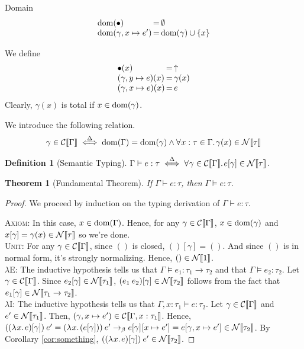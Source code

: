 \documentclass{article}
\newtheorem{theorem}{Theorem}
\theoremstyle{definition}
\newtheorem{definition}{Definition}
\begin{document}
Domain
\[
  \begin{array}{l@{\,=\,}l}
    \Dom(\bullet) & \emptyset\\
    \Dom(\gamma, x \mapsto e') & \Dom(\gamma) \cup \{x\}
  \end{array}
\]

We define
\[
  \begin{array}{l@{\,=\,}l}
    \bullet(x) & \uparrow\\
    (\gamma, y \mapsto e)(x) & \gamma(x)\\
    (\gamma, x \mapsto e)(x) & e
  \end{array}
\]
Clearly, $\gamma(x)$ is total if $x \in \mathrm{dom}(\gamma)$.

We introduce the following relation.
\[
  \gamma \in \mathcal{C}\llbracket\Gamma\rrbracket \overset{\Delta}{\iff} \mathrm{dom}(\Gamma) = \mathrm{dom}(\gamma) \land \forall\mkern1mux : \tau \in \Gamma.\mkern2mu\gamma(x) \in \mathcal{N}\llbracket\tau\rrbracket
\]

\begin{definition}[Semantic Typing]
  $\Gamma \vDash e : \tau \overset{\Delta}{\iff} \forall\mkern1mu\gamma \in \mathcal{C}\llbracket\Gamma\rrbracket.\mkern2mue[\gamma] \in \mathcal{N}\llbracket\tau\rrbracket$.
\end{definition}

\begin{theorem}[Fundamental Theorem]
  If $\Gamma \vdash e : \tau$, then $\Gamma \vDash e : \tau$.
\end{theorem}
\begin{proof}
  We proceed by induction on the typing derivation of $\Gamma \vdash e : \tau$.
  
  \textsc{Axiom}:
  In this case, $x \in \mathrm{dom}(\Gamma)$.
  Hence, for any $\gamma \in \mathcal{C}\llbracket\Gamma\rrbracket$, $x \in \mathrm{dom}(\gamma)$ and $x[\gamma] = \gamma(x) \in \mathcal{N}\llbracket\tau\rrbracket$ so we're done.\\

  \textsc{Unit}:
  For any $\gamma \in \mathcal{C}\llbracket\Gamma\rrbracket$, since $()$ is closed, $()[\gamma] = ()$.
  And since $()$ is in normal form, it's strongly normalizing.
  Hence, $() \in \mathcal{N}\llbracket1\rrbracket$.\\

  \textsc{$\lambda$E}:
  The inductive hypothesis tells us that $\Gamma \vDash e_{1} : \tau_{1} \to \tau_{2}$ and that $\Gamma \vDash e_{2} : \tau_{2}$.
  Let $\gamma \in \mathcal{C}\llbracket\Gamma\rrbracket$.
  Since $e_{2}[\gamma] \in \mathcal{N}\llbracket\tau_{1}\rrbracket$, $(e_{1}\mkern4mue_{2})[\gamma] \in \mathcal{N}\llbracket\tau_{2}\rrbracket$ follows from the fact that $e_{1}[\gamma] \in \mathcal{N}\llbracket\tau_{1} \to \tau_{2}\rrbracket$.\\

  \textsc{$\lambda$I}:
  The inductive hypothesis tells us that $\Gamma, x : \tau_{1} \vDash e : \tau_{2}$.
  Let $\gamma \in \mathcal{C}\llbracket\Gamma\rrbracket$ and $e' \in \mathcal{N}\llbracket\tau_{1}\rrbracket$.
  Then, $(\gamma, x \mapsto e') \in \mathcal{C}\llbracket\Gamma, x : \tau_{1}\rrbracket$.
  Hence, $((\lambda\mkern1mux.\mkern2mue)[\gamma])\mkern4mue' = (\lambda\mkern1mux.\mkern2mu(e[\gamma]))\mkern4mue'\to_{\beta}e[\gamma]\mkern1mu[x \mapsto e'] = e[\gamma, x \mapsto e'] \in \mathcal{N}\llbracket\tau_{2}\rrbracket$.
  By Corollary \ref{cor:something}, $((\lambda\mkern1mux.\mkern2mue)[\gamma])\mkern4mue' \in \mathcal{N}\llbracket\tau_{2}\rrbracket$.
\end{proof}
\end{document}
